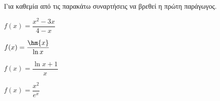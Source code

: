 Για καθεμία από τις παρακάτω συναρτήσεις να βρεθεί η πρώτη παράγωγος.
\begin{multicols}{2}
\begin{alist}
\item $ f(x)=\dfrac{x^2-3x}{4-x} $
\item $ f(x)=\dfrac{\hm{x}}{\ln{x}} $
\item $ f(x)=\dfrac{\ln{x}+1}{x} $
\item $ f(x)=\dfrac{x^2}{e^x} $
\end{alist}
\end{multicols}
